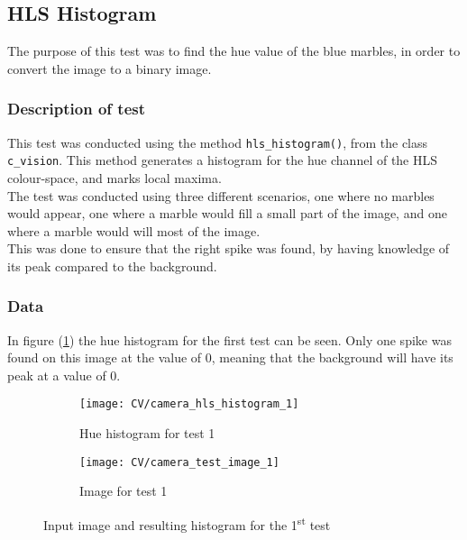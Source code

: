 \documentclass[../Head/Main.tex]{subfiles}
\begin{document}
\subsection{HLS Histogram}
\label{subsec:test_HLS_hist}
The purpose of this test was to find the hue value of the blue marbles, in order to convert the image to a binary image. 

\subsubsection*{Description of test}

This test was conducted using the method \texttt{hls\_histogram()}, from the class \texttt{c\_vision}. This method generates a histogram for the hue channel of the HLS colour-space, and marks local maxima.\\
The test was conducted using three different scenarios, one where no marbles would appear, one where a marble would fill a small part of the image, and one where a marble would will most of the image.\\
This was done to ensure that the right spike was found, by having knowledge of its peak compared to the background.  
\subsubsection*{Data}
In figure (\ref{fig:hist_test_1}) the hue histogram for the first test can be seen. Only one spike was found on this image at the value of 0, meaning that the background will have its peak at a value of 0. 

\begin{figure}[H]
	\centering
	\begin{subfigure}[b]{0.48\textwidth}
		\centering
		\texttt{[image: CV/camera\_hls\_histogram\_1]}
		\caption{Hue histogram for test 1}
		\label{fig:hist_test_1}
	\end{subfigure}
	\hfill
	\begin{subfigure}[b]{0.5\textwidth}
		\centering
		\texttt{[image: CV/camera\_test\_image\_1]}
		\caption{Image for test 1}
		\label{fig:image_test_1}
	\end{subfigure}
	\caption{Input image and resulting histogram for the 1\textsuperscript{st} test}
	\label{fig:test_1}
\end{figure}
\end{document}
